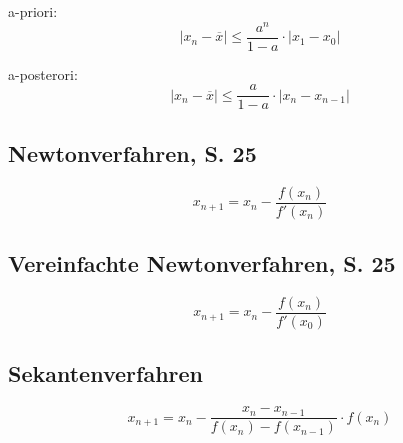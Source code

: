 a-priori:
\[|x_n - \overline{x}| \leq{} \frac{a^n}{1 - a} \cdot |x_1 - x_0|\]

a-posterori:
\[|x_n - \overline{x}| \leq{} \frac{a}{1 - a} \cdot |x_n - x_{n-1}|\]

\subsection{Newtonverfahren, S. 25}

\[x_{n+1} = x_n - \frac{f(x_n)}{f'(x_n)}\]

\subsection{Vereinfachte Newtonverfahren, S. 25}

\[x_{n+1} = x_n - \frac{f(x_n)}{f'(x_0)}\]

\subsection{Sekantenverfahren}

\[x_{n+1} = x_n - \frac{x_n-x_{n-1}}{f(x_n) - f(x_{n-1})} \cdot f(x_n)\]


